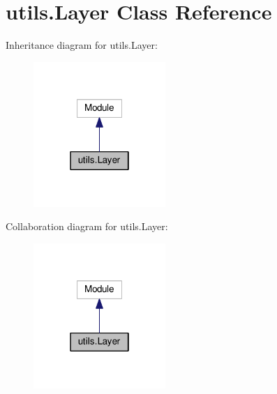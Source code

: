 \hypertarget{classutils_1_1Layer}{}\section{utils.\+Layer Class Reference}
\label{classutils_1_1Layer}


Inheritance diagram for utils.\+Layer\+:
\nopagebreak
\begin{figure}[H]
\begin{center}
\leavevmode
\includegraphics[width=142pt]{classutils_1_1Layer__inherit__graph}
\end{center}
\end{figure}


Collaboration diagram for utils.\+Layer\+:
\nopagebreak
\begin{figure}[H]
\begin{center}
\leavevmode
\includegraphics[width=142pt]{classutils_1_1Layer__coll__graph}
\end{center}
\end{figure}

